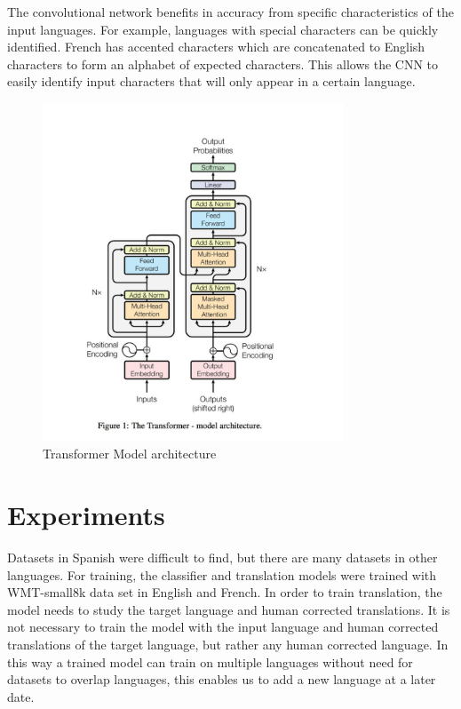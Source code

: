 \documentclass[10pt,a4paper]{article}
\begin{document}
  The convolutional network benefits in accuracy from specific characteristics of the input languages. For example, languages with special characters can be quickly identified. French has accented characters which are concatenated to English characters to form an alphabet of expected characters. This allows the CNN to easily identify input characters that will only appear in a certain language.

\begin{figure}
  \begin{center}
    \includegraphics[width=0.8\textwidth] {transformer.jpg}
    \caption{Transformer Model architecture}
  \end{center}
\end{figure}

\section{Experiments}

  Datasets in Spanish were difficult to find, but there are many datasets in other languages. For training, the classifier and translation models were trained with WMT-small8k data set in English and French. In order to train translation, the model needs to study the target language and human corrected translations. It is not necessary to train the model with the input language and human corrected translations of the target language, but rather any human corrected language. In this way a trained model can train on multiple languages without need for datasets to overlap languages, this enables us to add a new language at a later date.
\end{document}

